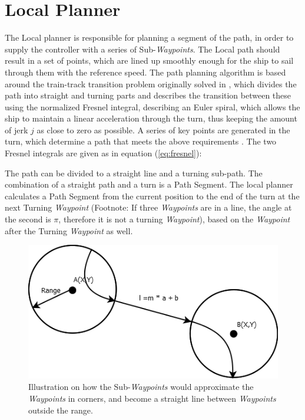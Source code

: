 \section{Local Planner}

The Local planner is responsible for planning a segment of the path, in order to supply the controller with a series of Sub-\emph{Waypoints}. The Local path should result in a set of points, which are lined up smoothly enough for the ship to sail through them with the reference speed.
The path planning algorithm is based around the train-track transition problem originally solved in \cite{Art1}, which divides the path into straight and turning parts and describes the transition between these using the normalized Fresnel integral, describing an Euler spiral, which allows the ship to maintain a linear acceleration through the turn, thus keeping the amount of jerk $j$ as close to zero as possible. A series of key points are generated in the turn, which determine a path that meets the above requirements \cite{Art2}. The two Fresnel integrals are given as in equation (\ref{eq:fresnel}):

The path can be divided to a straight line and a turning sub-path. The combination of a straight path and a turn is a Path Segment. The local planner calculates a Path Segment from the current position to the end of the turn at the next Turning \emph{Waypoint} (Footnote: If three \emph{Waypoints} are in a line, the angle at the second is $\pi$, therefore it is not a turning \emph{Waypoint}), based on the \emph{Waypoint} after the Turning \emph{Waypoint} as well.

\begin{figure}[htbp]
\centering
\includegraphics[width = \textwidth]{img/LocalPlannerFigures/StraightRoute.png}
\caption{Illustration on how the Sub-\emph{Waypoints} would approximate the \emph{Waypoints} in corners, and become a straight line between \emph{Waypoints} outside the range.}
\label{fig:straight}
\end{figure}

